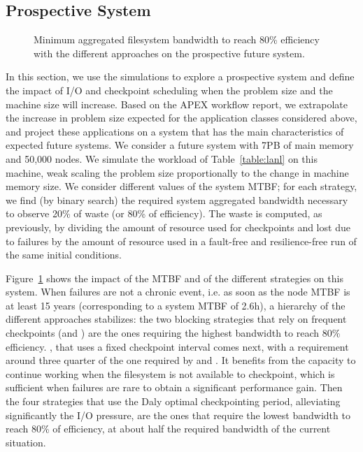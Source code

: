 \subsection{Prospective System}

\begin{figure}
  \begin{center}
    \resizebox{\linewidth}{!}{}
  \end{center}
  \caption{Minimum aggregated filesystem bandwidth to reach 80\%
    efficiency with the different approaches on the prospective
    future system.\label{fig:prosp}}
\end{figure}

In this section, we use the simulations to explore a prospective
system and define the impact of I/O and checkpoint scheduling when the
problem size and the machine size will increase. Based on the APEX
workflow report, we extrapolate the increase in problem size expected
for the application classes considered above, and project these
applications on a system that has the main characteristics of expected
future systems. We consider a future system with 7PB of main memory
and 50,000 nodes. We simulate the workload of Table~\ref{table:lanl}
on this machine, weak scaling the problem size proportionally to the
change in machine memory size. We consider different values of the
system MTBF; for each strategy, we find (by binary search) the
required system aggregated bandwidth necessary to observe 20\% of
waste (or 80\% of efficiency). The waste is computed, as previously,
by dividing the amount of resource used for checkpoints and lost due
to failures by the amount of resource used in a fault-free and
resilience-free run of the same initial conditions.

Figure~\ref{fig:prosp} shows the impact of the MTBF and of the
different strategies on this system. When failures are not a chronic
event, i.e. as soon as the node MTBF is at least 15 years
(corresponding to a system MTBF of 2.6h), a hierarchy of the different
approaches stabilizes: the two blocking strategies that rely on
frequent checkpoints (\propfixed and \bfifofixed) are the ones
requiring the highest bandwidth to reach 80\%
efficiency. %
\fifofixed, that uses a fixed checkpoint interval comes next, with a
requirement around three quarter of the one required by \propfixed and
\fifofixed. It benefits from the capacity to continue working when the
filesystem is not available to checkpoint, which is sufficient when
failures are rare to obtain a significant performance
gain. %
Then the four strategies that use the Daly optimal checkpointing
period, alleviating significantly the I/O pressure, are the ones that
require the lowest bandwidth to reach 80\% of efficiency, at about
half the required bandwidth of the current
situation. %

